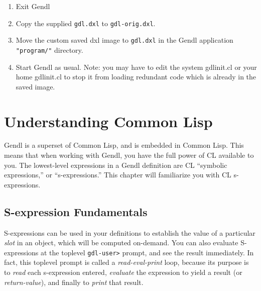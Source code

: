 \documentclass [11pt]{book}
\begin{document}
\begin{enumerate}

\item Exit Gendl

\item Copy the supplied \texttt{gdl.dxl} to \texttt{gdl-orig.dxl}.

\item Move the custom saved dxl image to \texttt{gdl.dxl} in the Gendl application \texttt{"program/"} directory.

\item Start Gendl as usual. Note: you may have to edit the system gdlinit.cl or your home gdlinit.cl
to stop it from loading redundant code which is already in the saved image.

\end{enumerate}



\chapter{Understanding Common Lisp}

\label{chap:understandingcommonlisp}



Gendl is a superset of Common Lisp, and is embedded in Common
Lisp. This means that when working with Gendl, you have the full power
of CL available to you. The lowest-level expressions in a Gendl
definition are CL ``symbolic expressions,'' or ``s-expressions.''
This chapter will familiarize you with CL s-expressions.



\section{S-expression Fundamentals}

\label{sec:s-expressionfundamentals}



S-expressions can be used in your definitions to establish
the value of a particular \emph{slot} in an object, which will be computed on-demand. You can also
evaluate S-expressions at the toplevel \texttt{gdl-user\textgreater} prompt, and see the result immediately. In fact, this toplevel prompt is called a \emph{read-eval-print} loop, because its purpose is to \emph{read} each s-expression  entered, \emph{evaluate} the expression to yield a result (or \emph{return-value}), and finally to \emph{print} that result.
\end{document}
